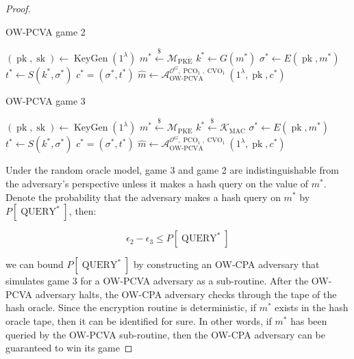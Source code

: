 \documentclass{article}
\newcommand{\leftsample}{\overset{{\scriptscriptstyle\$}}{\leftarrow}}
\newcommand{\keygen}{\operatorname{KeyGen}}
\newcommand{\pk}{\operatorname{pk}}
\newcommand{\sk}{\operatorname{sk}}
\newcommand{\pco}{\operatorname{PCO}}
\newcommand{\cvo}{\operatorname{CVO}}
\newcommand{\llbrack}{[\![}
\newcommand{\rrbrack}{]\!]}
\begin{document}
\begin{proof}
    \begin{multicols}{2}
        \begin{algorithm}[H]
            \caption{OW-PCVA game 2}
            \SetAlgoLined
            $(\pk, \sk) \leftarrow \keygen(1^\lambda)$\;
            $m^\ast \leftsample \mathcal{M}_\text{PKE}$\;
            $k^\ast \leftarrow G(m^\ast)$\;
            $\sigma^\ast \leftarrow E(\pk, m^\ast)$\;
            $t^\ast \leftarrow S(k^\ast, \sigma^\ast)$\;
            $c^\ast = (\sigma^\ast, t^\ast)$\;
            $\hat{m} \leftarrow \mathcal{A}_\text{OW-PCVA}^{
                \mathcal{O}^G, \pco_1, \cvo_1
            }(1^\lambda, \pk, c^\ast)$\;
            \Return{$\llbrack \hat{m} = m^\ast \rrbrack$}
        \end{algorithm}

        \begin{algorithm}[H]
            \caption{OW-PCVA game 3}
            \SetAlgoLined
            $(\pk, \sk) \leftarrow \keygen(1^\lambda)$\;
            $m^\ast \leftsample \mathcal{M}_\text{PKE}$\;
            $k^\ast \leftsample \mathcal{K}_\text{MAC}$\;
            $\sigma^\ast \leftarrow E(\pk, m^\ast)$\;
            $t^\ast \leftarrow S(k^\ast, \sigma^\ast)$\;
            $c^\ast = (\sigma^\ast, t^\ast)$\;
            $\hat{m} \leftarrow \mathcal{A}_\text{OW-PCVA}^{
                \mathcal{O}^G, \pco_1, \cvo_1
            }(1^\lambda, \pk, c^\ast)$\;
            \Return{$\llbrack \hat{m} = m^\ast \rrbrack$}
        \end{algorithm}
    \end{multicols}
    
    
    Under the random oracle model, game 3 and game 2 are indistinguishable from the adversary's perspective unless it makes a hash query on the value of $m^\ast$. Denote the probability that the adversary makes a hash query on $m^\ast$ by $P[\operatorname{QUERY}^\ast]$, then:

    \begin{equation*}
        \epsilon_2 - \epsilon_3 \leq P[\operatorname{QUERY}^\ast]
    \end{equation*}

    we can bound $P[\operatorname{QUERY}^\ast]$ by constructing an OW-CPA adversary that simulates game 3 for a OW-PCVA adversary as a sub-routine. After the OW-PCVA adversary halts, the OW-CPA adversary checks through the tape of the hash oracle. Since the encryption routine is deterministic, if $m^\ast$ exists in the hash oracle tape, then it can be identified for sure. In other words, if $m^\ast$ has been queried by the OW-PCVA sub-routine, then the OW-CPA adversary can be guaranteed to win its game


\end{proof}
\end{document}
